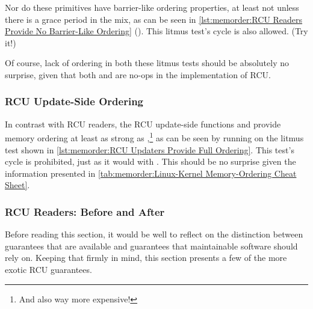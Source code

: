 Nor do these primitives have barrier-like ordering properties,
at least not unless there is a grace period in the mix, as can be seen in
\cref{lst:memorder:RCU Readers Provide No Barrier-Like Ordering}
().
This litmus test's cycle is also allowed.
(Try it!)

\begin{listing}

\caption{RCU Readers Provide No Barrier-Like Ordering}
\label{lst:memorder:RCU Readers Provide No Barrier-Like Ordering}
\end{listing}

Of course, lack of ordering in both these litmus tests should be absolutely
no surprise, given that both  and 
are no-ops in the  implementation of RCU\@.

\subsubsection{RCU Update-Side Ordering}
\label{sec:memorder:RCU Update-Side Ordering}

In contrast with RCU readers, the RCU update-side functions
 and 
provide memory ordering at least as strong as ,\footnote{
	And also way more expensive!}
as can be seen by running  on the litmus test shown in
\cref{lst:memorder:RCU Updaters Provide Full Ordering}.
This test's cycle is prohibited, just as it would with .
This should be no surprise given the information presented in
\cref{tab:memorder:Linux-Kernel Memory-Ordering Cheat Sheet}.

\begin{listing}

\caption{RCU Updaters Provide Full Ordering}
\label{lst:memorder:RCU Updaters Provide Full Ordering}
\end{listing}

\subsubsection{RCU Readers:
			    Before and After}
\label{sec:memorder:RCU Readers: Before and After}

Before reading this section, it would be well to reflect on the distinction
between guarantees that are available and guarantees that maintainable
software should rely on.
Keeping that firmly in mind, this section presents a few of the
more exotic RCU guarantees.


